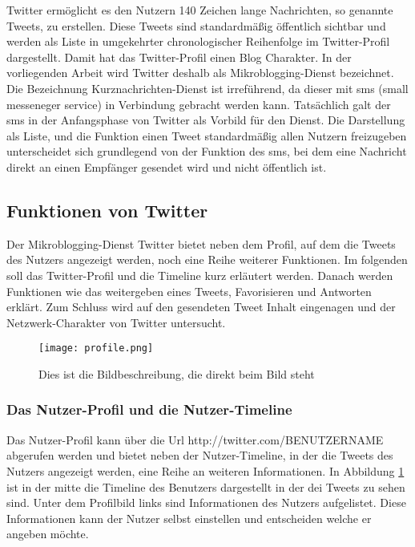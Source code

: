 	Twitter ermöglicht es den Nutzern 140 Zeichen lange Nachrichten, so genannte Tweets, zu erstellen. 
	Diese Tweets sind standardmäßig öffentlich sichtbar und werden als Liste in umgekehrter chronologischer Reihenfolge im Twitter-Profil dargestellt. 
	Damit hat das Twitter-Profil einen Blog Charakter.  
	In der vorliegenden Arbeit wird Twitter deshalb als Mikroblogging-Dienst bezeichnet.
	Die Bezeichnung Kurznachrichten-Dienst ist irreführend, da dieser mit sms (small messeneger service) in Verbindung gebracht werden kann. 
	Tatsächlich galt der sms in der Anfangsphase von Twitter als Vorbild für den Dienst.
	Die Darstellung als Liste, und die Funktion einen Tweet standardmäßig allen Nutzern freizugeben unterscheidet sich grundlegend von der Funktion des sms, bei dem eine Nachricht direkt an einen Empfänger gesendet wird und nicht öffentlich ist.

	\subsection{Funktionen von Twitter}
	Der Mikroblogging-Dienst Twitter bietet neben dem Profil, auf dem die Tweets des Nutzers angezeigt werden, noch eine Reihe weiterer Funktionen. 
	Im folgenden soll das Twitter-Profil und die Timeline kurz erläutert werden. 
	Danach werden Funktionen wie das weitergeben eines Tweets, Favorisieren und Antworten erklärt. 
	Zum Schluss wird auf den gesendeten Tweet Inhalt eingenagen und der Netzwerk-Charakter von Twitter untersucht.

	\begin{figure}[h!]
	\begin{center}
	\texttt{[image: profile.png]}
	\caption{Dies ist die Bildbeschreibung, die direkt beim Bild steht}
	\label{twitterProfile}
	\end{center}
	\end{figure}


		\subsubsection{Das Nutzer-Profil und die Nutzer-Timeline}
			Das Nutzer-Profil kann über die Url http://twitter.com/BENUTZERNAME abgerufen werden und bietet neben der Nutzer-Timeline, in der die Tweets des Nutzers angezeigt werden, eine Reihe an weiteren Informationen.
			In Abbildung \ref{twitterProfile} ist in der mitte die Timeline des Benutzers dargestellt in der dei Tweets zu sehen sind. 
			Unter dem Profilbild links sind Informationen des Nutzers aufgelistet.
			Diese Informationen kann der Nutzer selbst einstellen und entscheiden welche er angeben möchte.   


